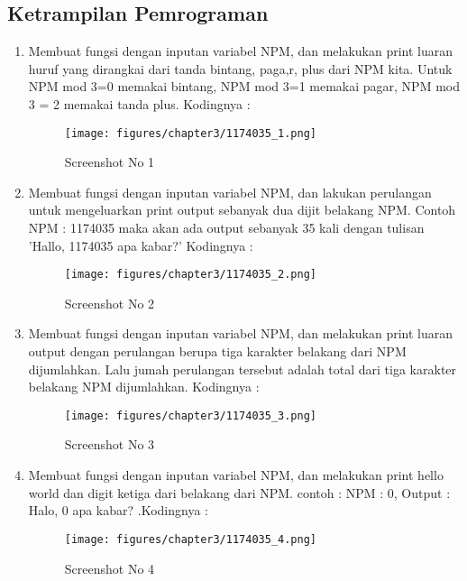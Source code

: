\subsection{Ketrampilan Pemrograman}
\begin{enumerate}
	\item Membuat fungsi dengan inputan variabel NPM, dan melakukan print luaran huruf yang dirangkai dari tanda bintang, paga,r, plus dari NPM kita. Untuk NPM mod 3=0 memakai bintang, NPM mod 3=1 memakai pagar, NPM mod 3 = 2 memakai tanda plus. Kodingnya : 
	
	\begin{figure}[!htbp]
        \centering
        \texttt{[image: figures/chapter3/1174035\_1.png]}
        \caption{Screenshot No 1}
        \label{1174035_1}
	\end{figure}
	\item Membuat fungsi dengan inputan variabel NPM, dan lakukan perulangan untuk mengeluarkan print output sebanyak dua dijit belakang NPM. Contoh NPM : 1174035 maka akan ada output sebanyak 35 kali dengan tulisan 'Hallo, 1174035 apa kabar?' Kodingnya : 
	
	\begin{figure}[!htbp]
        \centering
        \texttt{[image: figures/chapter3/1174035\_2.png]}
        \caption{Screenshot No 2}
        \label{1174035_2}
	\end{figure}
	\item Membuat fungsi dengan inputan variabel NPM, dan melakukan print luaran output dengan perulangan berupa tiga karakter belakang dari NPM dijumlahkan. Lalu jumah perulangan tersebut adalah total dari tiga karakter belakang NPM dijumlahkan. Kodingnya : 
	
	\begin{figure}[!htbp]
        \centering
        \texttt{[image: figures/chapter3/1174035\_3.png]}
        \caption{Screenshot No 3}
        \label{1174035_3}
	\end{figure}
	\item Membuat fungsi dengan inputan variabel NPM, dan melakukan print hello world dan digit ketiga dari belakang dari NPM. contoh : NPM : 0, Output : Halo, 0 apa kabar? .Kodingnya : 
	
	\begin{figure}[!htbp]
        \centering
        \texttt{[image: figures/chapter3/1174035\_4.png]}
        \caption{Screenshot No 4}
        \label{1174035_4}

\end{figure}
\end{enumerate}
